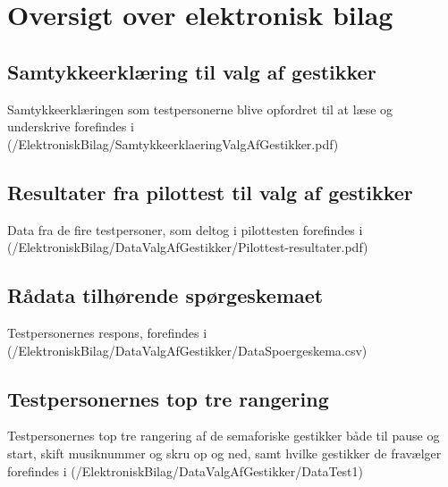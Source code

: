 \chapter{Oversigt over elektronisk bilag}
\label{app:OversigtOverElektroniskBilag}
%
%
\section{Samtykkeerklæring til valg af gestikker}
\label{app:SamtykkeerklaeringValgAfGestikker}
%
Samtykkeerklæringen som testpersonerne blive opfordret til at læse og underskrive forefindes i (/ElektroniskBilag/SamtykkeerklaeringValgAfGestikker.pdf)
%
\section{Resultater fra pilottest til valg af gestikker}
\label{app:ResultaterPilottestValgAfGestikker}
%
Data fra de fire testpersoner, som deltog i pilottesten forefindes i 
(/ElektroniskBilag/DataValgAfGestikker/Pilottest-resultater.pdf)
%
\section{Rådata tilhørende spørgeskemaet}
\label{app:RaaDataSpoergeskema}
%
Testpersonernes respons, forefindes i (/ElektroniskBilag/DataValgAfGestikker/DataSpoergeskema.csv)
%
\section{Testpersonernes top tre rangering}
\label{app:TestpersonernesTopTre}
%
Testpersonernes top tre rangering af de semaforiske gestikker både til pause og start, skift musiknummer og skru op og ned, samt hvilke gestikker de fravælger forefindes i (/ElektroniskBilag/DataValgAfGestikker/DataTest1)